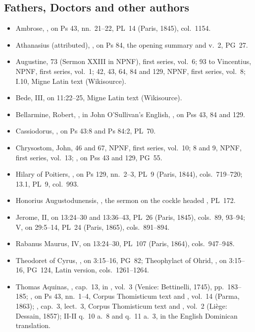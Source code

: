 {\subsection*{Fathers, Doctors and other authors}
\begin{itemize}[leftmargin=1.2em,itemsep=.25em]
\item Ambrose, , on Ps 43, nn.~21--22, PL~14
(Paris, 1845), col.~1154.
\item Athanasius (attributed), , on Ps 84, the
opening summary and v.~2, PG~27.
\item Augustine,  73 (Sermon XXIII in NPNF), first series,
vol.~6;  93 to Vincentius, NPNF, first series, vol.~1;
 42, 43, 64, 84 and 129, NPNF, first series,
vol.~8;  I.10, Migne Latin text (Wikisource).
\item Bede,  III, on 11:22--25, Migne
Latin text (Wikisource).
\item Bellarmine, Robert, , in John O'Sullivan's
English, , on Pss 43, 84 and 129.
\item Cassiodorus, , on Ps 43:8 and Ps 84:2, PL~70.
\item Chrysostom, John,  46 and 67, NPNF, first
series, vol.~10;  8 and 9, NPNF, first series,
vol.~13; , on Pss 43 and 129, PG~55.
\item Hilary of Poitiers, , on Ps 129, nn.~2--3,
PL~9 (Paris, 1844), cols.~719--720;  13.1, PL~9, col.~993.
\item Honorius Augustodunensis, , the sermon on the
cockle headed , PL~172.
\item Jerome,  II, on 13:24--30 and 13:36--43,
PL~26 (Paris, 1845), cols.~89, 93--94;  V, on 29:5--14,
PL~24 (Paris, 1865), cols.~891--894.
\item Rabanus Maurus,  IV, on 13:24--30, PL~107
(Paris, 1864), cols.~947--948.
\item Theodoret of Cyrus, , on
3:15--16, PG~82; Theophylact of Ohrid, , on 3:15--16, PG~124, Latin version, cols.~1261--1264.
\item Thomas Aquinas, , cap.~13, in
, vol.~3 (Venice: Bettinelli, 1745), pp.~183--185;
, on Ps 43, nn.~1--4, Corpus Thomisticum text and
, vol.~14 (Parma, 1863); , cap.~3, lect.~3, Corpus Thomisticum text and , vol.~2 (Liège: Dessain, 1857);
 II-II q.~10 a.~8 and q.~11 a.~3, in the English
Dominican translation.
\end{itemize}

}
